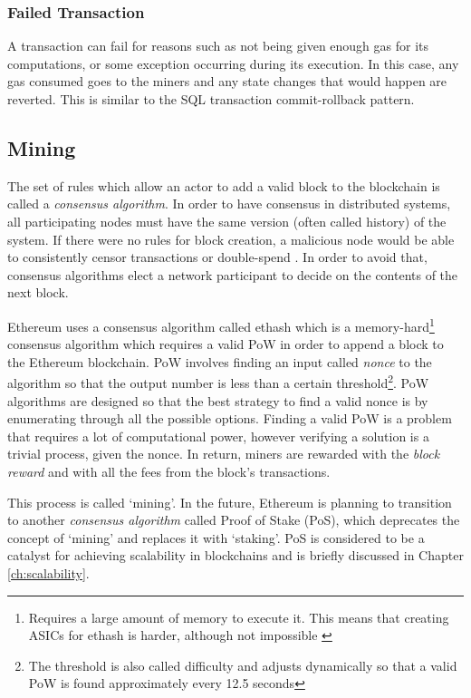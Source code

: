 \subsubsection{Failed Transaction}
A transaction can fail for reasons such as not being given enough gas for its computations, or some exception occurring during its execution. In this case, any gas consumed goes to the miners and any state changes that would happen are reverted. This is similar to the SQL transaction commit-rollback pattern.



\subsection{Mining}
The set of rules which allow an actor to add a valid block to the blockchain is called a \textit{consensus algorithm}. In order to have consensus in distributed systems, all participating nodes must have the same version (often called history) of the system. If there were no rules for block creation, a malicious node would be able to consistently censor transactions or double-spend \cite{doublespend}. In order to avoid that, consensus algorithms elect a network participant to decide on the contents of the next block. 

Ethereum uses a consensus algorithm called ethash\cite{ethash} which is a memory-hard\footnote{Requires a large amount of memory to execute it. This means that creating ASICs for ethash is harder, although not impossible \cite{asicfork}} consensus algorithm which requires a valid PoW in order to append a block to the Ethereum blockchain. PoW involves finding an input called \textit{nonce} to the algorithm so that the output number is less than a certain threshold\footnote{The threshold is also called difficulty and adjusts dynamically so that a valid PoW is found approximately every 12.5 seconds}. PoW algorithms are designed so that the best strategy to find a valid nonce is by enumerating through all the possible options. Finding a valid PoW is a problem that requires a lot of computational power, however verifying a solution is a trivial process, given the nonce. In return, miners are rewarded with the \textit{block reward} and with all the fees from the block's transactions.

This process is called `mining'. In the future, Ethereum is planning to transition to another \textit{consensus algorithm} called Proof of Stake (PoS), which deprecates the concept of `mining' and replaces it with `staking'. PoS is considered to be a catalyst for achieving scalability in blockchains and is briefly discussed in Chapter \ref{ch:scalability}.


